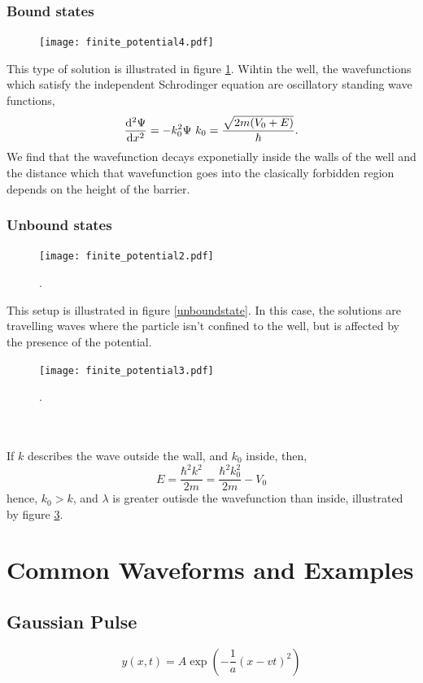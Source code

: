 \documentclass{book}
\begin{document}
\subsection{Bound states}
\begin{figure}
	\centering
	\texttt{[image: finite\_potential4.pdf]}
	\caption{} 
	\label{boundstate}
\end{figure}
This type of solution is illustrated in figure \ref{boundstate}. Wihtin the well, the wavefunctions which satisfy the independent Schrodinger equation are oscillatory standing wave functions,
\begin{equation}
	\dv[2]{\Psi}{x} = -k_0^2\Psi \text{ } k_0 = \frac{\sqrt{2m(V_0 + E)}}{\hbar}.
\end{equation}
We find that the wavefunction decays exponetially inside the walls of the well and the distance which that wavefunction goes into the clasically forbidden region depends on the height of the barrier.
\subsection{Unbound states}
\begin{figure}
	\centering
	\texttt{[image: finite\_potential2.pdf]}
	\caption{} 
	\label{unboundstate}.
\end{figure}
This setup is illustrated in figure \eqref{unboundstate}. In this case, the solutions are travelling waves where the particle isn't confined to the well, but is affected by the presence of the potential.
\begin{figure}
	\centering
	\texttt{[image: finite\_potential3.pdf]}
	\caption{} 
	\label{lolkek}.
\end{figure}
\\\\
If $k$ describes the wave outside the wall, and $k_0$ inside, then,
\begin{equation}
	E = \frac{\hbar^2 k^2}{2m} = \frac{\hbar^2k_0^2}{2m} - V_0
\end{equation}
hence, $k_0 > k$, and $\lambda$ is greater outisde the wavefunction than inside, illustrated by figure \ref{lolkek}.
\appendix
\chapter{Common Waveforms and Examples}
\section{Gaussian Pulse}
\begin{equation}
    y(x,t) = A\exp\left(-\frac{1}{a}(x-vt)^2\right)
\end{equation}
\end{document}
